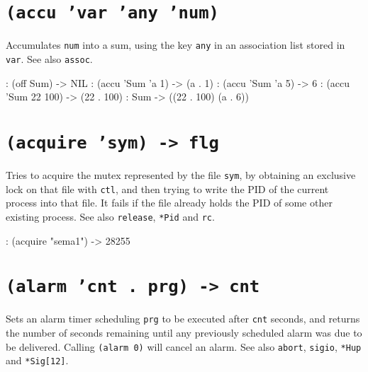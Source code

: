  
\section*{\texttt{(accu 'var 'any 'num)}}
\label{sec:func-ref-A-(accu 'var 'any 'num)}


Accumulates \texttt{num} into a sum, using the key \texttt{any} in an association list
stored in \texttt{var}. See also \texttt{assoc}.


\begin{wideverbatim}
: (off Sum)
-> NIL
: (accu 'Sum 'a 1)
-> (a . 1)
: (accu 'Sum 'a 5)
-> 6
: (accu 'Sum 22 100)
-> (22 . 100)
: Sum
-> ((22 . 100) (a . 6))
\end{wideverbatim}

 
\section*{\texttt{(acquire 'sym) -> flg}}
\label{sec:func-ref-A-(acquire 'sym) -> flg}


Tries to acquire the mutex represented by the file \texttt{sym}, by obtaining
an exclusive lock on that file with \texttt{ctl}, and then trying to write the
PID of the current process into that file. It fails if the file already
holds the PID of some other existing process. See also \texttt{release}, \texttt{*Pid}
and \texttt{rc}.


\begin{wideverbatim}
: (acquire "sema1")
-> 28255
\end{wideverbatim}

 
\section*{\texttt{(alarm 'cnt . prg) -> cnt}}
\label{sec:func-ref-A-(alarm 'cnt . prg) -> cnt}


Sets an alarm timer scheduling \texttt{prg} to be executed after \texttt{cnt} seconds,
and returns the number of seconds remaining until any previously
scheduled alarm was due to be delivered. Calling \texttt{(alarm 0)} will cancel
an alarm. See also \texttt{abort}, \texttt{sigio}, \texttt{*Hup} and \texttt{*Sig[12]}.




